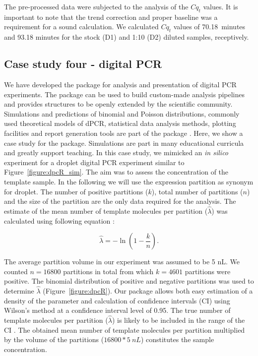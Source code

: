 The pre-processed data were subjected to the analysis of the $Cq_{t}$ values. 
It is important to note that the trend correction and proper baseline was a 
requirement for a sound calculation. We calculated $Cq_{t}$ values of 
70.18~minutes and 93.18 minutes for the stock (D1) and 1:10 (D2) diluted 
samples, receptively.

\subsection{Case study four - digital PCR}

We have developed the  package for analysis and presentation of 
digital PCR experiments. The  package can be used to build 
custom-made analysis pipelines and provides structures to be openly extended by 
the scientific community. Simulations and predictions of binomial and Poisson 
distributions, commonly used theoretical models of dPCR, statistical data 
analysis methods, plotting facilities and report generation tools are part of 
the package \citep{pabinger_2014}. Here, we show a case study for the 
 package. Simulations are part in many educational curricula and 
greatly support teaching. In this case study, we mimicked an \textit{in silico} 
experiment for a droplet digital PCR experiment similar to Figure~\ref{figure:dpcR_sim}. 
The aim was to assess the concentration of the template sample. In the following 
we will use the expression partition as synonym for droplet. The number of 
positive partitions ($k$), total number of partitions ($n$) and the size of the 
partition are the only data required for the analysis. The estimate of the mean 
number of template molecules per partition ($\hat \lambda$) was calculated using 
following equation \citep{huggett_2013}:

\begin{equation}
\hat{\lambda} =  -\ln{(1 - \frac{k}{n})}.
\end{equation}

The average partition volume in our experiment was assumed to be 5 nL. We 
counted $n = 16800$ partitions in total from which $k = 4601$ partitions were 
positive. The binomial distribution of positive and negative partitions was used 
to determine $\hat \lambda$ (Figure~\ref{figure:dpcR}). Our package allows both 
easy estimation of a density of the parameter and calculation of confidence 
intervals (CI) using Wilson's method \citep{brown_2001} at a confidence interval 
level of 0.95. The true number of template molecules per partition ($\hat 
\lambda$) is likely to be included in the range of the CI \citep{milbury_2014}. 
The obtained mean number of template molecules per partition multiplied by the 
volume of the partitions ($ 16800 * 5~nL$) constitutes the sample concentration.

